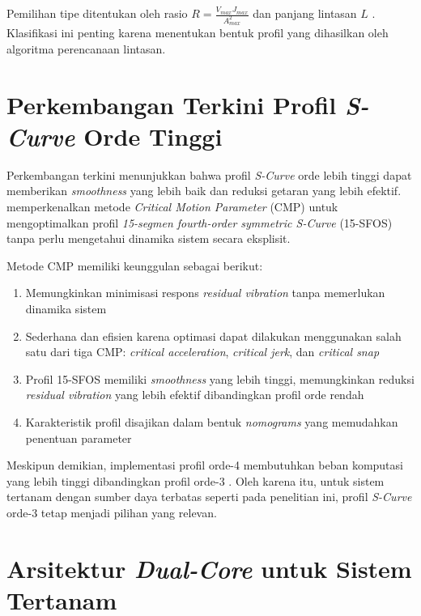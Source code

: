 Pemilihan tipe ditentukan oleh rasio \(R = \frac{V_{max}J_{max}}{A_{max}^2}\) dan panjang lintasan \(L\) \parencite{9310134}. Klasifikasi ini penting karena menentukan bentuk profil yang dihasilkan oleh algoritma perencanaan lintasan.

\section{Perkembangan Terkini Profil \textit{S-Curve} Orde Tinggi}

Perkembangan terkini menunjukkan bahwa profil \textit{S-Curve} orde lebih tinggi dapat memberikan \textit{smoothness} yang lebih baik dan reduksi getaran yang lebih efektif. \textcite{tatte2026optimized} memperkenalkan metode \textit{Critical Motion Parameter} (CMP) untuk mengoptimalkan profil \textit{15-segmen fourth-order symmetric S-Curve} (15-SFOS) tanpa perlu mengetahui dinamika sistem secara eksplisit. 

Metode CMP memiliki keunggulan sebagai berikut:
\begin{enumerate}
    \item Memungkinkan minimisasi respons \textit{residual vibration} tanpa memerlukan dinamika sistem
    \item Sederhana dan efisien karena optimasi dapat dilakukan menggunakan salah satu dari tiga CMP: \textit{critical acceleration}, \textit{critical jerk}, dan \textit{critical snap}
    \item Profil 15-SFOS memiliki \textit{smoothness} yang lebih tinggi, memungkinkan reduksi \textit{residual vibration} yang lebih efektif dibandingkan profil orde rendah
    \item Karakteristik profil disajikan dalam bentuk \textit{nomograms} yang memudahkan penentuan parameter
\end{enumerate}

Meskipun demikian, implementasi profil orde-4 membutuhkan beban komputasi yang lebih tinggi dibandingkan profil orde-3 \parencite{tatte2026optimized}. Oleh karena itu, untuk sistem tertanam dengan sumber daya terbatas seperti pada penelitian ini, profil \textit{S-Curve} orde-3 tetap menjadi pilihan yang relevan.

\section{Arsitektur \textit{Dual-Core} untuk Sistem Tertanam}

